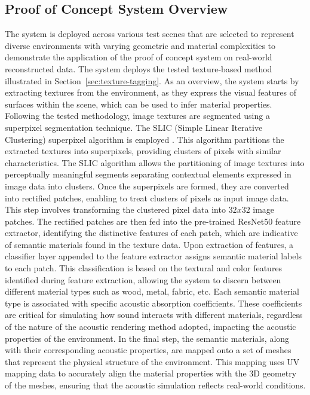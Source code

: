 \subsection{Proof of Concept System Overview}
The system is deployed across various test scenes that are selected to represent diverse environments with varying geometric and material complexities to demonstrate the application of the proof of concept system on real-world reconstructed data. The system deploys the tested texture-based method illustrated in Section~\ref{sec:texture-tagging}. As an overview, the system starts by extracting textures from the environment, as they express the visual features of surfaces within the scene, which can be used to infer material properties.
Following the tested methodology, image textures are segmented using a superpixel segmentation technique. The SLIC (Simple Linear Iterative Clustering) superpixel algorithm is employed \citep{slic6205760}. This algorithm partitions the extracted textures into superpixels, providing clusters of pixels with similar characteristics. The SLIC algorithm allows the partitioning of image textures into perceptually meaningful segments separating contextual elements expressed in image data into clusters. Once the superpixels are formed, they are converted into rectified patches, enabling  to treat clusters of pixels as input image data. This step involves transforming the clustered pixel data into $32x32$ image patches.
The rectified patches are then fed into the pre-trained ResNet50 feature extractor, identifying the distinctive features of each patch, which are indicative of semantic materials found in the texture data. Upon extraction of features, a classifier layer appended to the feature extractor assigns semantic material labels to each patch. This classification is based on the textural and color features identified during feature extraction, allowing the system to discern between different material types such as wood, metal, fabric, etc. Each semantic material type is associated with specific acoustic absorption coefficients. These coefficients are critical for simulating how sound interacts with different materials, regardless of the nature of the acoustic rendering method adopted, impacting the acoustic properties of the environment. In the final step, the semantic materials, along with their corresponding acoustic properties, are mapped onto a set of meshes that represent the physical structure of the environment. This mapping uses UV mapping data to accurately align the material properties with the 3D geometry of the meshes, ensuring that the acoustic simulation reflects real-world conditions.

